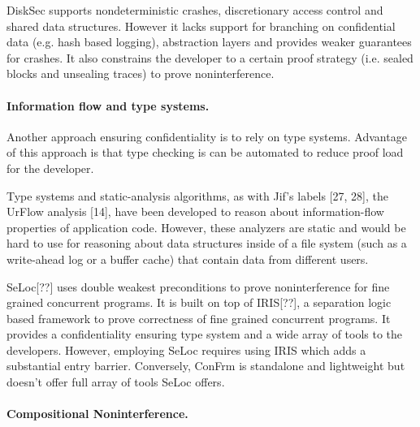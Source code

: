 DiskSec supports nondeterministic crashes, discretionary access control and shared data structures. However it lacks support for branching on confidential data (e.g. hash based logging), abstraction layers and provides weaker guarantees for crashes. It also constrains the developer to a certain proof strategy (i.e. sealed blocks and unsealing traces) to prove noninterference.

\paragraph{Information flow and type systems.} 
Another approach ensuring confidentiality is to rely on type systems. Advantage of this approach is that type checking is can be automated to reduce proof load for the developer.

Type systems and static-analysis algorithms, as with
Jif’s labels [27, 28], the UrFlow analysis [14], have been
developed to reason about information-flow properties of
application code. However, these analyzers are static and
would be hard to use for reasoning about data structures
inside of a file system (such as a write-ahead log or a
buffer cache) that contain data from different users.

SeLoc[??] uses double weakest preconditions to prove noninterference for fine grained concurrent programs. It is built on top of IRIS[??], a separation logic based framework to prove correctness of fine grained concurrent programs. It provides a confidentiality ensuring type system and a wide array of tools to the developers. However, employing SeLoc requires using IRIS which adds a substantial entry barrier. Conversely, ConFrm is standalone and lightweight but doesn't offer full array of tools SeLoc offers.

\paragraph{Compositional Noninterference.} 
	
	
	
	

